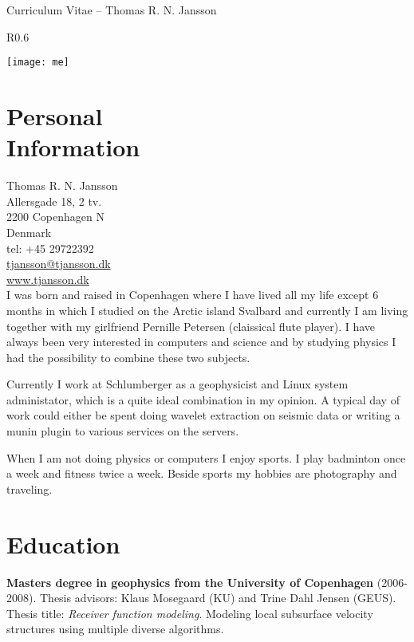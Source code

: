 \documentclass[margin,line,a4paper]{resume05}
\begin{document}
{\sc \Large Curriculum Vitae -- Thomas R. N. Jansson}
\begin{resume}
    \vspace{0.5cm}
    \begin{wrapfigure}{R}{0.6\textwidth}
        \vspace{-1cm}
       \begin{center}
       \texttt{[image: me]}
       \end{center}
        \vspace{-1cm}
    \end{wrapfigure}

    \section{\mysidestyle Personal\\Information}%
    Thomas R. N. Jansson \\
    Allersgade 18, 2 tv.  \\ 
    2200 Copenhagen N \\ 
    Denmark \\ 
    tel: +45 29722392 \\
    \href{mailto:tjansson@tjansson.dk}{tjansson@tjansson.dk} \\
    \href{http://www.tjansson.dk}{www.tjansson.dk}\\    

    I was born and raised in Copenhagen where I have liv\-ed all my life except
    6 months in which I studied on the Arctic island Svalbard and currently I
    am living together with my girlfriend Pernille Petersen (claissical flute
    player).  I have always been very interested in computers and science and
    by studying physics I had the possibility to combine these two subjects. 

    Currently I work at Schlumberger as a geophysicist and Linux system
    administator, which is a quite ideal combination in my opinion. A typical
    day of work could either be spent doing wavelet extraction on seismic data
    or writing a munin plugin to various services on the servers. 
    
    When I am not doing physics or computers I  enjoy sports. I play badminton
    once a week and fitness twice a week. Beside sports my hobbies are
    photography and traveling.

    \section{\mysidestyle Education} \textbf{Masters degree in geophysics from
    the University of Copenhagen} (2006-2008). Thesis advisors: Klaus Mosegaard
    (KU) and Trine Dahl Jensen (GEUS).  Thesis title: \textit{Receiver function
    modeling}. Modeling local subsurface velocity structures using multiple
    diverse algorithms.


\end{resume}
\end{document}
